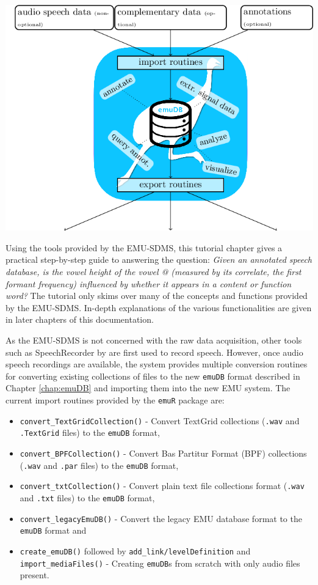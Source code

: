 \documentclass[]{book}
\providecommand{\tightlist}{%
  \setlength{\itemsep}{0pt}\setlength{\parskip}{0pt}}
\begin{document}
\begin{center}\includegraphics[width=0.65\linewidth]{pics/emuSdmsBirdsEye} \end{center}

Using the tools provided by the EMU-SDMS, this tutorial chapter gives a practical step-by-step guide to answering the question: \emph{Given an annotated speech database, is the vowel height of the vowel @ (measured by its correlate, the first formant frequency) influenced by whether it appears in a content or function word?} The tutorial only skims over many of the concepts and functions provided by the EMU-SDMS. In-depth explanations of the various functionalities are given in later chapters of this documentation.

As the EMU-SDMS is not concerned with the raw data acquisition, other tools such as SpeechRecorder by \citet{draxler:2004a} are first used to record speech. However, once audio speech recordings are available, the system provides multiple conversion routines for converting existing collections of files to the new \texttt{emuDB} format described in Chapter \ref{chap:emuDB} and importing them into the new EMU system. The current import routines provided by the \texttt{emuR} package are:

\begin{itemize}
\tightlist
\item
  \texttt{convert\_TextGridCollection()} - Convert TextGrid collections (\texttt{.wav} and \texttt{.TextGrid} files) to the \texttt{emuDB} format,
\item
  \texttt{convert\_BPFCollection()} - Convert Bas Partitur Format (BPF) collections (\texttt{.wav} and \texttt{.par} files) to the \texttt{emuDB} format,
\item
  \texttt{convert\_txtCollection()} - Convert plain text file collections format (\texttt{.wav} and \texttt{.txt} files) to the \texttt{emuDB} format,
\item
  \texttt{convert\_legacyEmuDB()} - Convert the legacy EMU database format to the \texttt{emuDB} format and
\item
  \texttt{create\_emuDB()} followed by \texttt{add\_link/levelDefinition} and \texttt{import\_mediaFiles()} - Creating \texttt{emuDB}s from scratch with only audio files present.
\end{itemize}
\end{document}
